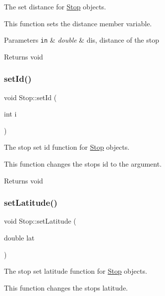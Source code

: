 \begin{figure}[H]
\begin{center}
The set distance for \hyperlink{classStop}{Stop} objects. 

This function sets the distance member variable.


\begin{DoxyParams}[1]{Parameters}
\mbox{\tt in}  & {\em double} & dis, distance of the stop\\
\hline
\end{DoxyParams}
\begin{DoxyReturn}{Returns}
void 
\end{DoxyReturn}
\mbox{\label{classStop_a936324668d7b9f5edfbe4531cf244608}} 
\subsubsection{\texorpdfstring{set\+Id()}{setId()}}
{\footnotesize\ttfamily void Stop\+::set\+Id (\begin{DoxyParamCaption}\item[{int}]{i }\end{DoxyParamCaption})}



The stop set id function for \hyperlink{classStop}{Stop} objects. 

This function changes the stop\textquotesingle{}s id to the argument.

\begin{DoxyReturn}{Returns}
void 
\end{DoxyReturn}
\mbox{\label{classStop_ad70323088d687724e6eaad1eb723061f}} 
\subsubsection{\texorpdfstring{set\+Latitude()}{setLatitude()}}
{\footnotesize\ttfamily void Stop\+::set\+Latitude (\begin{DoxyParamCaption}\item[{double}]{lat }\end{DoxyParamCaption})}



The stop set latitude function for \hyperlink{classStop}{Stop} objects. 

This function changes the stop\textquotesingle{}s latitude.


\end{center}
\end{figure}
